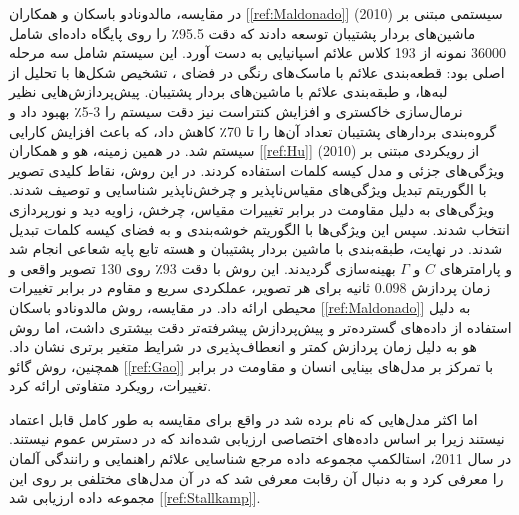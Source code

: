 در مقایسه، مالدونادو باسکان و همکاران [\ref{ref:Maldonado}] (2010) سیستمی مبتنی بر ماشین‌های بردار پشتیبان توسعه دادند که دقت 95.5٪ را روی پایگاه داده‌ای شامل 36000 نمونه از 193 کلاس علائم اسپانیایی به دست آورد. این سیستم شامل سه مرحله اصلی بود: قطعه‌بندی علائم با ماسک‌های رنگی در فضای ، تشخیص شکل‌ها با تحلیل  از لبه‌ها، و طبقه‌بندی علائم با ماشین‌های بردار پشتیبان. پیش‌پردازش‌هایی نظیر نرمال‌سازی خاکستری و افزایش کنتراست نیز دقت سیستم را 3-5٪ بهبود داد و گروه‌بندی بردارهای پشتیبان تعداد آن‌ها را تا 70٪ کاهش داد، که باعث افزایش کارایی سیستم شد.
در همین زمینه، هو و همکاران [\ref{ref:Hu}] (2010) از رویکردی مبتنی بر ویژگی‌های جزئی و مدل کیسه کلمات استفاده کردند. در این روش، نقاط کلیدی تصویر با الگوریتم تبدیل ویژگی‌های مقیاس‌ناپذیر و چرخش‌ناپذیر شناسایی و توصیف شدند. ویژگی‌های  به دلیل مقاومت در برابر تغییرات مقیاس، چرخش، زاویه دید و نورپردازی انتخاب شدند. سپس این ویژگی‌ها با الگوریتم خوشه‌بندی و به فضای کیسه کلمات تبدیل شدند. در نهایت، طبقه‌بندی با ماشین بردار پشتیبان و هسته تابع پایه شعاعی انجام شد و پارامترهای $C$ و $\Gamma$ بهینه‌سازی گردیدند. این روش با دقت 93٪ روی 130 تصویر واقعی و زمان پردازش 0.098 ثانیه برای هر تصویر، عملکردی سریع و مقاوم در برابر تغییرات محیطی ارائه داد. در مقایسه، روش مالدونادو باسکان [\ref{ref:Maldonado}] به دلیل استفاده از داده‌های گسترده‌تر و پیش‌پردازش پیشرفته‌تر دقت بیشتری داشت، اما روش هو به دلیل زمان پردازش کمتر و انعطاف‌پذیری در شرایط متغیر برتری نشان داد. همچنین، روش گائو [\ref{ref:Gao}] با تمرکز بر مدل‌های بینایی انسان و مقاومت در برابر تغییرات، رویکرد متفاوتی ارائه کرد.

اما اکثر مدل‌هایی که نام برده شد در واقع برای مقایسه به طور کامل قابل اعتماد نیستند زیرا بر اساس داده‌های اختصاصی ارزیابی شده‌اند که در دسترس عموم نیستند. در سال 2011، استالکمپ مجموعه داده مرجع شناسایی علائم راهنمایی و رانندگی آلمان را معرفی کرد و به دنبال آن رقابت  معرفی شد که در آن مدل‌های مختلفی بر روی این مجموعه داده ارزیابی شد [\ref{ref:Stallkamp}].
